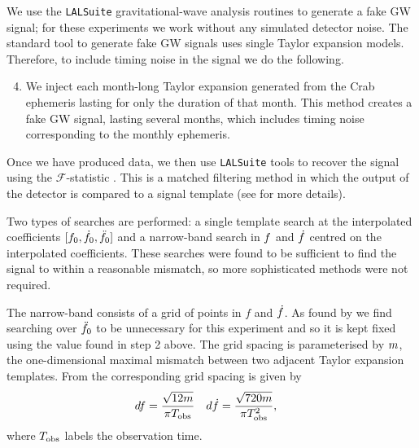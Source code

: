 \documentclass[../full_thesis/full_thesis.tex]{subfiles}
\begin{document}
We use the \verb+LALSuite+ \cite{lalsuite} gravitational-wave analysis routines
to generate a fake GW signal; for these experiments we work
without any simulated detector noise. The standard tool to generate fake GW
signals uses single Taylor expansion models. Therefore, to include timing noise
in the signal we do the following.

\begin{enumerate}
\setcounter{enumi}{3}

\item We inject each month-long Taylor expansion generated from the Crab ephemeris
lasting for only the duration of that month.
This
method creates a fake GW signal, lasting several months, which includes timing noise corresponding to the monthly
ephemeris.

\end{enumerate}

Once we have produced data, we then use \verb+LALSuite+ tools to recover the
signal using the $\mathcal{F}$-statistic \citep{Jaranowski1998}. This is a
matched filtering method in which the output of the detector is compared to a
signal template (see \citet{Prix2009} for more details).

Two types of searches are performed: a single
template search at the interpolated coefficients $[f_{0}, \dot{f}_{0},
\ddot{f}_{0}]$ and a narrow-band search in $f$ and $\dot{f}$ centred on the
interpolated coefficients. These searches were found to be sufficient
to find the signal to within a reasonable mismatch, so more sophisticated
methods were not required.

The narrow-band consists of a grid of points in
$f$ and $\dot{f}$. As found by \citet{abbott2008beating} we find searching over
$\ddot{f}_{0}$ to be unnecessary for this experiment and so it is kept fixed using
the value found in step 2 above.
 The grid spacing is parameterised
by $m$, the one-dimensional maximal mismatch between two adjacent Taylor
expansion templates. From
\citet{aasi2013einstein} the corresponding grid spacing is given by
\begin{align}
    df = \frac{\sqrt{12 m}}{\pi T_{\mathrm{obs}}} &&&
    d\dot{f} = \frac{\sqrt{720 m}}{\pi T_{\mathrm{obs}}^{2}},
\label{eqn: Grid spacing}
\end{align}
where $T_{\mathrm{obs}}$ labels the observation time.
\end{document}
